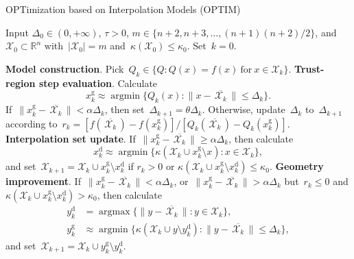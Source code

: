 \documentclass[11pt,a4paper,draft]{article}  %
\theoremstyle{definition}
\numberwithin{equation}{section}
\newcommand{\mbar}[1]{\,\overline{\!{#1}\!}\,} %
\newcommand{\xopt}{\mbar}
\DeclareMathOperator*{\argmax}{argmax}
\DeclareMathOperator*{\argmin}{argmin}
\newcommand{\RR}{\mathbb{R}}
\newcommand{\Int}{\mathcal{X}}
\newcommand{\get}{{\textrm{g}}}
\newcommand{\drop}{{\textrm{d}}}
\begin{document}
\begin{algorithm}[htbp!]
    \caption{\label{alg:optim}OPTimization based on Interpolation Models (OPTIM)}
    Input $\Delta_0\in (0,+\infty)$, $\tau>0$, $m\in \{n+2, n+3, \dots, (n+1)(n+2)/2\}$,
    and~$\Int_0\subset \RR^n$ with~$|\Int_0|=m$ and~$\kappa(\Int_0) \le \kappa_0$.
    Set~$k=0$.
    \begin{algorithmic}[1]
        \State \textbf{Model construction}.
        Pick~$Q_k \in \{Q \mathrel{:} Q(x)=f(x)~\text{for}~x\in\Int_k\}$.
        \State \textbf{Trust-region step evaluation}.
        Calculate
        \begin{equation}
         \label{eq:xget}
         x_k^\get \approx \argmin\{Q_k(x)\mathrel{:} \|x-\xopt{\Int_k}\|\le \Delta_k\}.
        \end{equation}
        If~$\|x_k^\get-\xopt{\Int_k}\| < \alpha\Delta_k$, then set~$\Delta_{k+1} = \theta \Delta_k$.
        Otherwise,
        update~$\Delta_k$ to~$\Delta_{k+1}$ according to~$r_k = [f(\xopt{\Int_k})
        - f(x_k^\get)]/[Q_k(\xopt{\Int_k}) - Q_k(x_k^\get)]$.
        \State \textbf{Interpolation set update}.
        If~$\|x_k^\get-\xopt{\Int_k}\| \ge \alpha\Delta_k$, then calculate
        \begin{equation}
            \label{eq:xdrop}
            x_k^\drop \approx \argmin\{\kappa(\Int_k\cup x_k^\get\setminus x) \mathrel{:} x \in
            \Int_k\},
        \end{equation}
        and set~$\Int_{k+1} = \Int_k\cup x_k^\get\setminus x_k^\drop$
        if $r_k>0$ or $\kappa(\Int_k\cup x_k^\get \setminus x_k^\drop) \le \kappa_0$.
        \State \textbf{Geometry improvement}.
        If~$\|x_k^\get-\xopt{\Int_k}\|< \alpha \Delta_k$, or~$\|x_k^\get-\xopt{\Int_k}\| > \alpha \Delta_k$
        but~$r_k\le 0$ and $\kappa(\Int_k \cup x_k^\get\setminus x_k^\drop) > \kappa_0$, then calculate
          \begin{align}
              \label{eq:ydrop}
              y_k^\drop &= \argmax\{\|y-\xopt{\Int_k}\| \mathrel{:} y \in \Int_k\}, \\
              \label{eq:yget}
              y_k^\get &\approx \argmin\{\kappa(\Int_k \cup y \setminus y_k^\drop) \mathrel{:}
                  \|y-\xopt{\Int_k}\|\le
              \Delta_k\},
          \end{align}
       and set~$\Int_{k+1} = \Int_k\cup y_k^\get\setminus y_k^\drop$.
    \end{algorithmic}
\end{algorithm}
\end{document}
